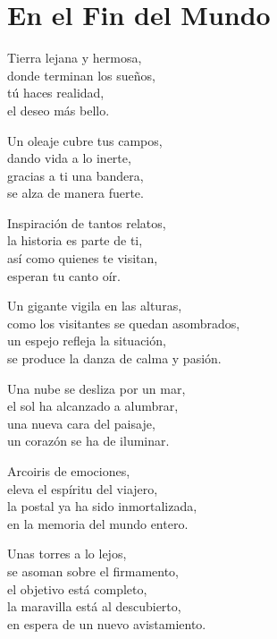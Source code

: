 \section*{En el Fin del Mundo}
\label{Fin_mundo}

\vspace{1em}
\begin{center}
Tierra lejana y hermosa,\\ 
donde terminan los sueños,\\ 
tú haces realidad,\\ 
el deseo más bello.

\vspace{1em} 
Un oleaje cubre tus campos,\\ 
dando vida a lo inerte,\\ 
gracias a ti una bandera,\\ 
se alza de manera fuerte.

\vspace{1em} 
Inspiración de tantos relatos,\\ 
la historia es parte de ti,\\ 
así como quienes te visitan,\\ 
esperan tu canto oír.

\vspace{1em} 
Un gigante vigila en las alturas,\\ 
como los visitantes se quedan asombrados,\\ 
un espejo refleja la situación,\\ 
se produce la danza de calma y pasión.

\vspace{1em} 
Una nube se desliza por un mar,\\ 
el sol ha alcanzado a alumbrar,\\ 
una nueva cara del paisaje,\\ 
un corazón se ha de iluminar.

\vspace{1em} 
Arcoiris de emociones,\\ 
eleva el espíritu del viajero,\\ 
la postal ya ha sido inmortalizada,\\ 
en la memoria del mundo entero.

\vspace{1em} 
Unas torres a lo lejos,\\ 
se asoman sobre el firmamento,\\ 
el objetivo está completo,\\ 
la maravilla está al descubierto,\\ 
en espera de un nuevo avistamiento.


\end{center}
